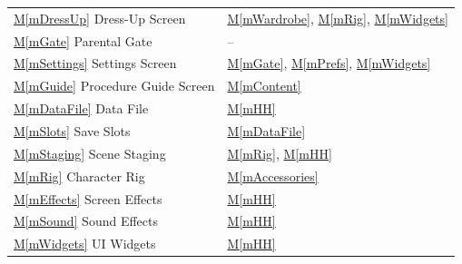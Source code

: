 \documentclass[10pt, titlepage]{article}
\newcommand{\mref}[1]{\texorpdfstring{\hyperref[md:#1]{M\ref*{#1}}}{M\ref*{#1}}}
\begin{document}
\begin{longtable}{p{} p{}}
\mref{mDressUp} Dress-Up Screen &
\mref{mWardrobe}, \mref{mRig}, \mref{mWidgets}\\

\mref{mGate} Parental Gate & --\\

\mref{mSettings} Settings Screen &
\mref{mGate}, \mref{mPrefs}, \mref{mWidgets}\\

\mref{mGuide} Procedure Guide Screen &
\mref{mContent}\\

\mref{mDataFile} Data File &
\mref{mHH}\\

\mref{mSlots} Save Slots &
\mref{mDataFile}\\

\mref{mStaging} Scene Staging &
\mref{mRig}, \mref{mHH}\\

\mref{mRig} Character Rig & \mref{mAccessories}\\

\mref{mEffects} Screen Effects &
\mref{mHH}\\

\mref{mSound} Sound Effects &
\mref{mHH}\\

\mref{mWidgets} UI Widgets &
\mref{mHH}\\

\bottomrule
\end{longtable}
\end{document}
